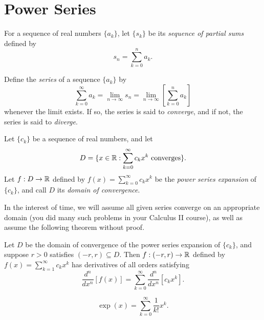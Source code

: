\documentclass[letterpaper, twoside, 12pt]{book}
\begin{document}
\section{Power Series}

\begin{definition}
  For a sequence of real numbers \(\{a_k\}\), let \(\{s_k\}\) be its
  \textit{sequence of partial sums} defined by
  \[
    s_n = \sum_{k=0}^{n} a_k
  .\]
\end{definition}

\begin{definition}
  Define the \textit{series} of a sequence \(\{a_k\}\) by
  \[
    \sum_{k=0}^\infty a_k
      =
    \lim_{n\to\infty} s_n
      =
    \lim_{n\to\infty}\left[\sum_{k=0}^{n} a_k\right]
  \]
  whenever the limit exists. If so, the series is said to \textit{converge},
  and if not, the series is said to \textit{diverge}.
\end{definition}

\begin{definition}
  Let \(\{c_k\}\) be a sequence of real numbers, and let
  \[
    D
      =
    \{
      x\in\mathbb R
    :
      \sum_{k=0}^\infty c_kx^k
      \text{ converges}
    \}
  .\]
  Let \(f:D\to\mathbb R\) defined by \(f(x)=\sum_{k=0}^\infty c_kx^k\) be
  the \textit{power series expansion} of \(\{c_k\}\), and call
  \(D\) its \textit{domain of convergence}.
\end{definition}

In the interest of time, we will assume all given series converge on
an appropriate domain (you did many such problems in your
Calculus II course), as well as assume the following theorem without proof.

\begin{theorem}[9.41]
  Let \(D\) be the domain of convergence of the power series expansion
  of \(\{c_k\}\), and suppose \(r>0\) satisfies \((-r,r)\subseteq D\).
  Then \(f:(-r,r)\to\mathbb R\) defined by
  \(f(x)=\sum_{k=1}^\infty c_kx^k\) has derivatives of all orders
  satisfying
  \[
    \frac{d^n}{dx^n}[f(x)]
      =
    \sum_{k=0}^\infty \frac{d^n}{dx^n}[c_kx^k]
  .\]
\end{theorem}

\begin{theorem}
  \[
   \exp(x)
      =
    \sum_{k=0}^\infty \frac{1}{k!}x^k
  .\]
\end{theorem}
\end{document}

